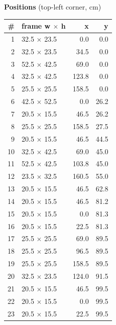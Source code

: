 \documentclass[a4paper,landscape,10pt]{article}
\begin{document}
\begin{minipage}[t]{0.25\textwidth}
\vspace{8pt}
{\bfseries Positions} (top-left corner, cm)\\[2pt]
\tiny
\begin{tabular}{@{}r l r r@{}}
\toprule
\# & frame w $\times$ h & x & y \\
\midrule
1 & 32.5 $\times$ 23.5 & 0.0 & 0.0 \\
2 & 32.5 $\times$ 23.5 & 34.5 & 0.0 \\
3 & 52.5 $\times$ 42.5 & 69.0 & 0.0 \\
4 & 32.5 $\times$ 42.5 & 123.8 & 0.0 \\
5 & 25.5 $\times$ 25.5 & 158.5 & 0.0 \\
6 & 42.5 $\times$ 52.5 & 0.0 & 26.2 \\
7 & 20.5 $\times$ 15.5 & 46.5 & 26.2 \\
8 & 25.5 $\times$ 25.5 & 158.5 & 27.5 \\
9 & 20.5 $\times$ 15.5 & 46.5 & 44.5 \\
10 & 32.5 $\times$ 42.5 & 69.0 & 45.0 \\
11 & 52.5 $\times$ 42.5 & 103.8 & 45.0 \\
12 & 23.5 $\times$ 32.5 & 160.5 & 55.0 \\
13 & 20.5 $\times$ 15.5 & 46.5 & 62.8 \\
14 & 20.5 $\times$ 15.5 & 46.5 & 81.2 \\
15 & 20.5 $\times$ 15.5 & 0.0 & 81.3 \\
16 & 20.5 $\times$ 15.5 & 22.5 & 81.3 \\
17 & 25.5 $\times$ 25.5 & 69.0 & 89.5 \\
18 & 25.5 $\times$ 25.5 & 96.5 & 89.5 \\
19 & 25.5 $\times$ 25.5 & 158.5 & 89.5 \\
20 & 32.5 $\times$ 23.5 & 124.0 & 91.5 \\
21 & 20.5 $\times$ 15.5 & 46.5 & 99.5 \\
22 & 20.5 $\times$ 15.5 & 0.0 & 99.5 \\
23 & 20.5 $\times$ 15.5 & 22.5 & 99.5 \\
\bottomrule
\end{tabular}
\end{minipage}
\clearpage
\end{document}
